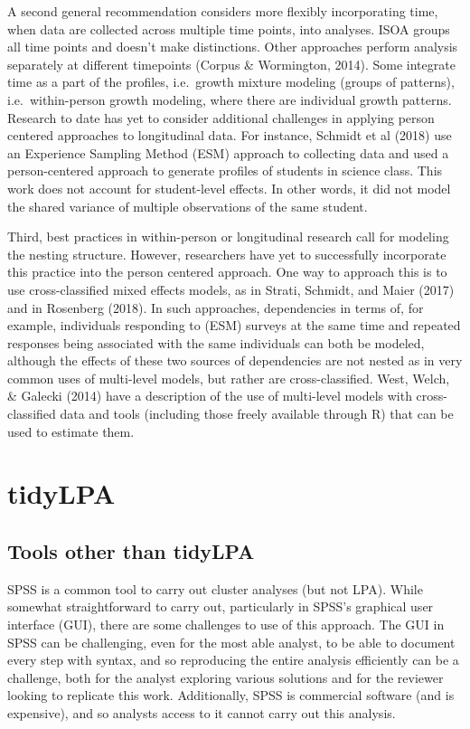 \documentclass[man]{apa6}
\begin{document}
A second general recommendation considers more flexibly incorporating time, when
data are collected across multiple time points, into analyses. ISOA groups all
time points and doesn't make distinctions. Other approaches perform analysis
separately at different timepoints (Corpus \& Wormington, 2014). Some integrate
time as a part of the profiles, i.e.~growth mixture modeling (groups of
patterns), i.e.~within-person growth modeling, where there are individual growth
patterns. Research to date has yet to consider additional challenges in applying
person centered approaches to longitudinal data. For instance, Schmidt et al
(2018) use an Experience Sampling Method (ESM) approach to collecting data and
used a person-centered approach to generate profiles of students in science
class. This work does not account for student-level effects. In other words, it
did not model the shared variance of multiple observations of the same student.

Third, best practices in within-person or longitudinal research call for
modeling the nesting structure. However, researchers have yet to successfully
incorporate this practice into the person centered approach. One way to approach
this is to use cross-classified mixed effects models, as in Strati, Schmidt, and
Maier (2017) and in Rosenberg (2018). In such approaches, dependencies in terms
of, for example, individuals responding to (ESM) surveys at the same time and
repeated responses being associated with the same individuals can both be
modeled, although the effects of these two sources of dependencies are not
nested as in very common uses of multi-level models, but rather are
cross-classified. West, Welch, \& Galecki (2014) have a description of the use of
multi-level models with cross-classified data and tools (including those freely
available through R) that can be used to estimate them.

\hypertarget{tidylpa}{%
\section{tidyLPA}\label{tidylpa}}

\hypertarget{tools-other-than-tidylpa}{%
\subsection{Tools other than tidyLPA}\label{tools-other-than-tidylpa}}

SPSS is a common tool to carry out cluster analyses (but not LPA). While
somewhat straightforward to carry out, particularly in SPSS's graphical user
interface (GUI), there are some challenges to use of this approach. The GUI in
SPSS can be challenging, even for the most able analyst, to be able to document
every step with syntax, and so reproducing the entire analysis efficiently can
be a challenge, both for the analyst exploring various solutions and for the
reviewer looking to replicate this work. Additionally, SPSS is commercial
software (and is expensive), and so analysts access to it cannot carry out this
analysis.
\end{document}
